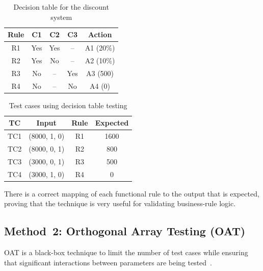 \documentclass[conference]{IEEEtran}
\begin{document}
\begin{table}[!t]

\centering

\caption{Decision table for the discount system}

\label{tab:decision_table}

\begin{tabular}{|c|c|c|c|c|}
\hline
\textbf{Rule} & \textbf{C1} & \textbf{C2} & \textbf{C3} & \textbf{Action} \\
\hline
R1 & Yes & Yes & -- & A1 (20\%) \\
R2 & Yes & No & -- & A2 (10\%) \\
R3 & No & -- & Yes & A3 (500) \\
R4 & No & -- & No & A4 (0) \\
\hline
\end{tabular}

\end{table}



\begin{table}[!t]

\centering

\caption{Test cases using decision table testing}

\label{tab:dt_tc}

\begin{tabular}{|c|c|c|c|}
\hline
\textbf{TC} & \textbf{Input} & \textbf{Rule} & \textbf{Expected} \\
\hline
TC1 & (8000, 1, 0) & R1 & 1600 \\
TC2 & (8000, 0, 1) & R2 & 800 \\
TC3 & (3000, 0, 1) & R3 & 500 \\
TC4 & (3000, 1, 0) & R4 & 0 \\
\hline
\end{tabular}

\end{table}



There is a correct mapping of each functional rule to the output that is expected, proving that the technique is very useful for validating business-rule logic.



\subsection{Method~2: Orthogonal Array Testing (OAT)}

OAT is a black-box technique to limit the number of test cases while ensuring that significant interactions between parameters are being tested~\cite{izzat2023,jalal2026}.
\end{document}
